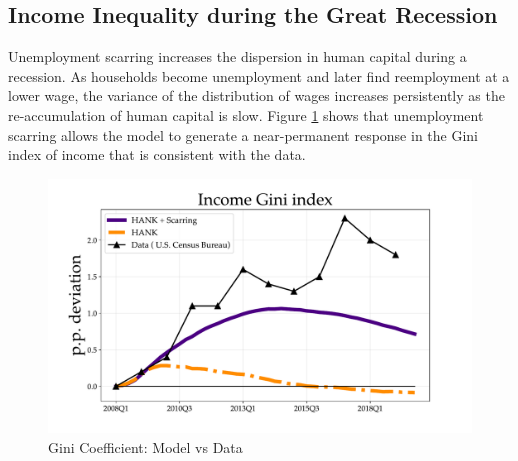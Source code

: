\subsection{Income Inequality during the Great Recession}

Unemployment scarring increases the dispersion in human capital during a recession. As households become unemployment and later find reemployment at a lower wage, the variance of the distribution of wages increases persistently as the re-accumulation of human capital is slow.  Figure \ref{Gini_GR} shows that unemployment scarring allows the model to generate a near-permanent response in the Gini index of income that is consistent with the data. 


\begin{figure}[!ht!]
\begin{center}
\includegraphics[scale=0.5]{text/chapter1/Figures/GR_sim/income_gini}
\end{center}
\caption{Gini Coefficient: Model vs Data}
 \label{Gini_GR}
\end{figure}

